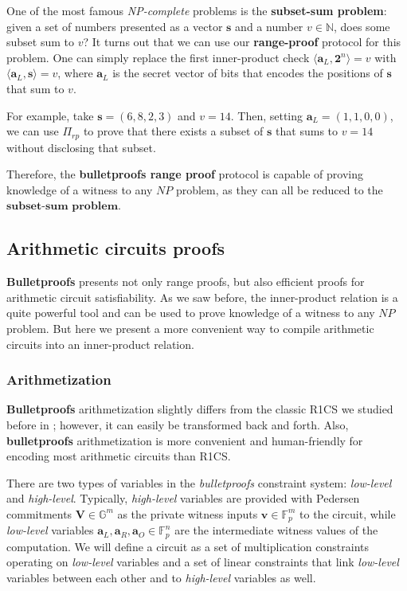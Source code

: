\documentclass[../../book.tex]{subfiles}
\begin{document}
\begin{example}
    One of the most famous \textit{NP-complete} problems is the \textbf{subset-sum problem}: given a set of numbers presented as a vector $\mathbf{s}$ and a number $v \in \mathbb{N}$, does some subset sum to $v$? It turns out that we can use our \textbf{range-proof} protocol for this problem. One can simply replace the first inner-product check $\langle \mathbf{a}_L, \mathbf{2}^n \rangle = v$ with $\langle \mathbf{a}_L, \mathbf{s} \rangle = v$, where $\mathbf{a}_L$ is the secret vector of bits that encodes the positions of $\mathbf{s}$ that sum to $v$.

    For example, take $\mathbf{s} = (6,8,2,3)$ and $v = 14$. Then, setting $\mathbf{a}_L = (1,1,0,0)$, we can use $\Pi_{rp}$ to prove that there exists a subset of $\mathbf{s}$ that sums to $v=14$ without disclosing that subset.

    Therefore, the \textbf{bulletproofs range proof} protocol is capable of proving knowledge of a witness to any $NP$ problem, as they can all be reduced to the $\textbf{subset-sum problem}$.
\end{example}
\subsection{Arithmetic circuits proofs}\label{subsection:bulletproofs-arithmetic-circuits}

\textbf{Bulletproofs} presents not only range proofs, but also efficient proofs for arithmetic circuit satisfiability. As we saw before, the inner-product relation is a quite powerful tool and can be used to prove knowledge of a witness to any $NP$ problem. But here we present a more convenient way to compile arithmetic circuits into an inner-product relation.

\subsubsection{Arithmetization}

\textbf{Bulletproofs} arithmetization slightly differs from the classic R1CS we studied before in ; however, it can easily be transformed back and forth. Also, \textbf{bulletproofs} arithmetization is more convenient and human-friendly for encoding most arithmetic circuits than R1CS.

There are two types of variables in the \textit{bulletproofs} constraint system: \textit{low-level} and \textit{high-level}. Typically, \textit{high-level} variables are provided with Pedersen commitments $\mathbf{V} \in \mathbb{G}^m$ as the private witness inputs $\mathbf{v} \in \mathbb{F}_p^m$ to the circuit, while \textit{low-level} variables $\mathbf{a}_L, \mathbf{a}_R, \mathbf{a}_O \in \mathbb{F}_p^n$ are the intermediate witness values of the computation. We will define a circuit as a set of multiplication constraints operating on \textit{low-level} variables and a set of linear constraints that link \textit{low-level} variables between each other and to \textit{high-level} variables as well.
\end{document}
